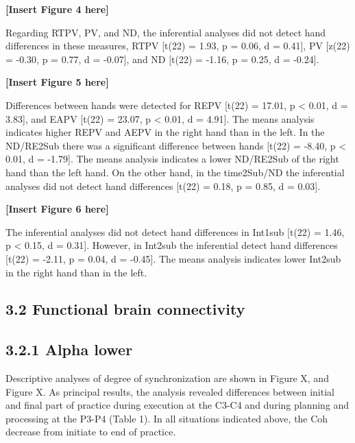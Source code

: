 \documentclass[man,a4paper,12pt,floatsintext]{apa6}
\begin{document}
\begin{center}
\textbf{[Insert Figure 4 here]}
\end{center}


Regarding RTPV, PV, and ND, the inferential analyses did not detect hand differences in these measures, RTPV [t(22) = 1.93, p = 0.06, d = 0.41], PV [z(22) = -0.30, p = 0.77, d = -0.07], and ND [t(22) = -1.16, p = 0.25, d = -0.24].

\begin{center}
\textbf{[Insert Figure 5 here]}
\end{center}


Differences between hands were detected for REPV [t(22) = 17.01, p < 0.01, d = 3.83], and EAPV [t(22) = 23.07, p < 0.01, d = 4.91]. The means analysis indicates higher REPV and AEPV in the right hand than in the left. In the ND/RE2Sub there was a significant difference between hands [t(22) = -8.40, p < 0.01, d = -1.79]. The means analysis indicates a lower ND/RE2Sub of the right hand than the left hand. On the other hand, in the time2Sub/ND the inferential analyses did not detect hand differences [t(22) = 0.18, p = 0.85, d = 0.03].  

\begin{center}
\textbf{[Insert Figure 6 here]}
\end{center}

The inferential analyses did not detect hand differences in Int1sub [t(22) = 1.46, p < 0.15, d = 0.31]. However, in Int2sub the inferential detect hand differences [t(22) = -2.11, p = 0.04, d = -0.45]. The means analysis indicates lower Int2sub in the right hand than in the left.

\subsection{3.2 Functional brain connectivity}
\subsection{3.2.1 Alpha lower}
Descriptive analyses of degree of synchronization are shown in Figure X, and Figure X. As principal results, the analysis revealed differences between initial and final part of practice during execution at the C3-C4 and during planning and processing at the P3-P4 (Table 1). In all situations indicated above, the Coh decrease from initiate to end of practice.
\end{document}
